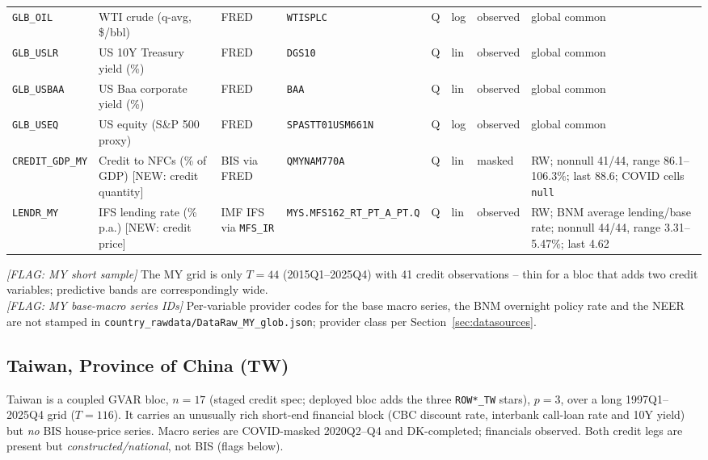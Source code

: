 {\begin{longtable}{p{2.3cm}p{3.3cm}p{2.1cm}p{2.2cm}p{0.6cm}p{1.4cm}p{1.9cm}p{2.4cm}}
\texttt{GLB\_OIL}   & WTI crude (q-avg, \$/bbl)          & FRED & \texttt{WTISPLC} & Q & log & observed & global common \\
\texttt{GLB\_USLR}  & US 10Y Treasury yield (\%)         & FRED & \texttt{DGS10} & Q & lin & observed & global common \\
\texttt{GLB\_USBAA} & US Baa corporate yield (\%)        & FRED & \texttt{BAA} & Q & lin & observed & global common \\
\texttt{GLB\_USEQ}  & US equity (S\&P 500 proxy)         & FRED & \texttt{SPASTT01USM661N} & Q & log & observed & global common \\
\texttt{CREDIT\_GDP\_MY} & Credit to NFCs (\% of GDP) [NEW: credit quantity] & BIS via FRED & \texttt{QMYNAM770A} & Q & lin & masked & RW; nonnull 41/44, range 86.1--106.3\%; last 88.6; COVID cells \texttt{null} \\
\texttt{LENDR\_MY}  & IFS lending rate (\% p.a.) [NEW: credit price] & IMF IFS via \texttt{MFS\_IR} & \texttt{MYS.\allowbreak MFS162\_RT\_PT\_A\_PT.\allowbreak Q} & Q & lin & observed & RW; BNM average lending/base rate; nonnull 44/44, range 3.31--5.47\%; last 4.62 \\
\end{longtable}}

\noindent\textit{[FLAG: MY short sample]} The MY grid is only $T=44$
(2015Q1--2025Q4) with 41 credit observations -- thin for a bloc that adds two
credit variables; predictive bands are correspondingly wide.\\
\textit{[FLAG: MY base-macro series IDs]} Per-variable provider codes for the
base macro series, the BNM overnight policy rate and the NEER are not stamped in
\texttt{country\_rawdata/DataRaw\_MY\_glob.json}; provider class per
Section~\ref{sec:datasources}.

\subsection{Taiwan, Province of China (TW)}\label{sec:data:TW}

Taiwan is a coupled GVAR bloc, $n=17$ (staged credit spec; deployed bloc adds
the three \texttt{ROW*\_TW} stars), $p=3$, over a long 1997Q1--2025Q4 grid
($T=116$). It carries an unusually rich short-end financial block (CBC discount
rate, interbank call-loan rate and 10Y yield) but \emph{no} BIS house-price
series. Macro series are COVID-masked 2020Q2--Q4 and DK-completed; financials
observed. Both credit legs are present but \emph{constructed/national}, not BIS
(flags below).

